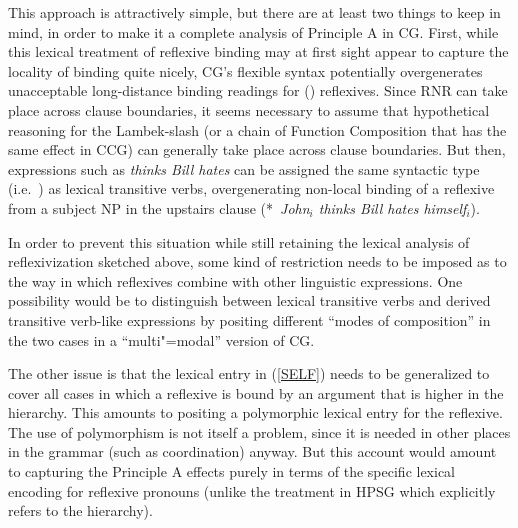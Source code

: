 \documentclass[output=paper,biblatex,babelshorthands,newtxmath,draftmode,colorlinks,citecolor=brown]{langscibook}
\begin{document}
\begin{exe}
 \ex\label{SELF}
        {}
        {}
\end{exe}

\noindent
This approach is attractively simple, but there are at least two
things to keep in mind, in order to make it a complete analysis of
Principle A in CG. First, while this 
lexical treatment of reflexive binding may at first sight 
appear to capture the locality of binding quite nicely, CG's flexible
syntax potentially overgenerates unacceptable long-distance binding
readings for () reflexives. Since RNR can take
place across clause boundaries,  it seems necessary to
assume that hypothetical reasoning for the Lambek-slash
(or a chain of Function Composition that has the same effect in CCG)
can generally take place across clause boundaries. But then,
expressions such as \textit{thinks Bill hates} can be assigned
the same syntactic type (i.e.\  ) as lexical transitive verbs,
overgenerating non-local binding of a reflexive from a subject NP in
the upstairs clause (*~\textit{John\ensuremath{_i} thinks Bill hates {himself\ensuremath{_i}}}).

In order to prevent this situation while still retaining the lexical
analysis of reflexivization sketched above, some kind of restriction
needs to be imposed as to the way in which reflexives combine with
other linguistic expressions. One possibility would be to distinguish
between lexical transitive verbs and derived transitive verb-like
expressions by positing different ``modes of composition'' in the two
cases in a ``multi"=modal'' version of CG.

The other issue is that the lexical entry in (\ref{SELF}) needs to be
generalized to cover all cases in which a reflexive is bound by an
argument that is higher in the  hierarchy. This amounts to
positing a polymorphic lexical entry for the reflexive. The use of
polymorphism is not itself a problem, since it is needed in other
places in the grammar (such as coordination) anyway. But this account
would amount to capturing the Principle A effects purely in terms of the 
specific lexical encoding for reflexive pronouns (unlike the treatment
in HPSG which explicitly refers to the  hierarchy).
\end{document}
